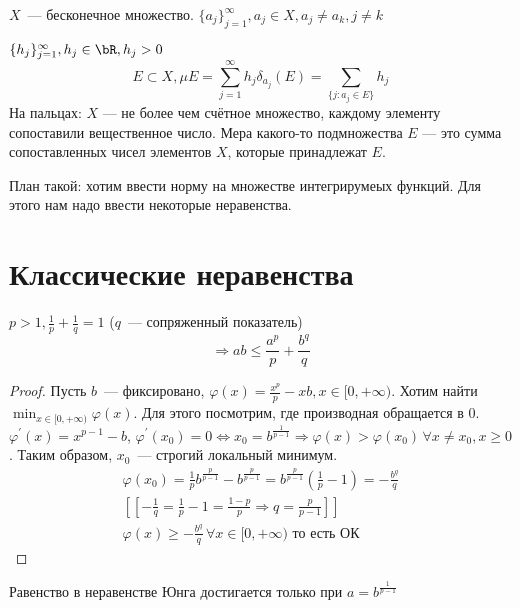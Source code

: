 \documentclass[document]{subfiles}
\begin{document}
\begin{example}
    $X$~--- бесконечное множество. $ \{ a_j \}_{j=1}^\infty, a_j \in X, a_j \ne a_k, j \ne k$ 
    
    $\{h_j \}^\infty_{j=1}, h_j \in \bR, h_j > 0$ 
    \[ E \subset X , \mu E = \sum^\infty_{j= 1} h_j\delta_{a_j}(E) = \sum_{\{ j: a_j \in E \}} h_j \]
    На пальцах: $X$ --- не более чем счётное множество, каждому элементу сопоставили вещественное число. Мера какого-то подмножества $E$ --- это сумма сопоставленных
    чисел элементов $X$, которые принадлежат $E$.
\end{example}

План такой: хотим ввести норму на множестве интегрирумеых функций. Для этого нам надо ввести некоторые неравенства.
\section{Классические неравенства}

\begin{theorem}
    $p > 1, \frac{1}{p} + \frac{1}{q} = 1$ ($q$~--- сопряженный показатель)
    \[ \Rightarrow ab \leq \frac{a^p}{p} + \frac{b^q}{q} \]
\end{theorem}

\begin{proof}
    Пусть $b$~--- фиксировано, $\varphi(x) = \frac{x^p}{p} - xb, x \in [0, + \infty)$. Хотим найти $\min_{x \in [0, +\infty)} \varphi(x)$. Для этого посмотрим, где производная обращается в 0.
    $\varphi^\prime(x) = x^{p-1} - b$, $\varphi^\prime(x_0) = 0 \Leftrightarrow x_0 = b^{\frac{1}{p-1}} \Rightarrow \varphi(x) > \varphi(x_0) \, \forall x \ne x_0, x \geq 0$.
    Таким образом, $x_0$~--- строгий локальный минимум.
    \begin{gather*}
        \varphi(x_0) = \frac{1}{p} b^{\frac{p}{p-1}} - b^{\frac{p}{p-1}} = b^{\frac{p}{p-1}}\left( \frac{1}{p} -1 \right)  = -\frac{b^q}{q}  \\
       \left[ \left[ -\frac{1}{q} = \frac{1}{p} - 1 = \frac{1-p}{p} \Rightarrow q = \frac{p}{p-1} \right] \right]\\
        \varphi(x) \geq - \frac{b^q}{q} \, \forall x \in [0, + \infty) \text { то есть ОК} 
    \end{gather*}
\end{proof}

\begin{remark}
    Равенство в неравенстве Юнга достигается только при $a = b^{\frac{1}{p-1}}$
\end{remark}
\end{document}
